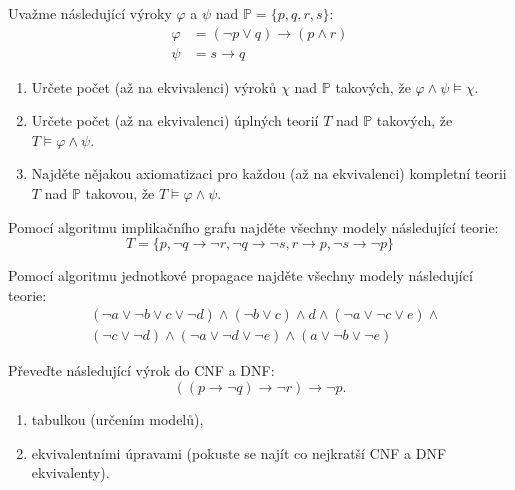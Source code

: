 \documentclass[a4paper,12pt]{article}
\begin{document}
\medskip\begin{problem}[2 body]
    Uvažme následující výroky $\varphi$ a $\psi$ nad $\mathbb P=\{p, q, r, s\}$:
    \begin{align*}
        \varphi &= (\neg p \vee  q)\to(p\wedge r)\\
        \psi &= s\to q
    \end{align*}
    \begin{enumerate}
        \item Určete počet (až na ekvivalenci) výroků $\chi$ nad $\mathbb P$ takových, že $\varphi\wedge\psi\models\chi$.
        \item Určete počet (až na ekvivalenci) úplných teorií $T$ nad $\mathbb P$ takových, že $T\models\varphi\wedge\psi$.
        \item Najděte nějakou axiomatizaci pro každou (až na ekvivalenci) kompletní teorii $T$ nad $\mathbb P$ takovou, že $T\models\varphi\wedge\psi$.
    \end{enumerate}
\end{problem}

\medskip\begin{problem}[2 body]
    Pomocí algoritmu implikačního grafu najděte všechny modely následující teorie:
    $$
    T=\{p,\neg q \to \neg r,\neg q \to \neg s,r \to p,\neg s \to \neg p\}
    $$
\end{problem}

\medskip\begin{problem}[1 bod]
    Pomocí algoritmu jednotkové propagace najděte všechny modely následující teorie:
    \begin{align*}
        &(\neg a \vee \neg b \vee c \vee \neg d)\wedge(\neg b \vee c)\wedge d \wedge (\neg a \vee \neg c \vee e)\wedge \\
        &(\neg c \vee \neg d)\wedge(\neg a \vee \neg d \vee \neg e)\wedge(a\vee \neg b \vee\neg e)
    \end{align*}
\end{problem}

\medskip\begin{problem}[1 bod]  
Převeďte následující výrok do CNF a DNF:
$$
((p\to \neg q) \to \neg r) \to \neg p.
$$
\begin{enumerate}
    \item tabulkou (určením modelů),
    \item ekvivalentními úpravami (pokuste se najít co nejkratší CNF a DNF ekvivalenty).
\end{enumerate}
\end{problem}
\end{document}
